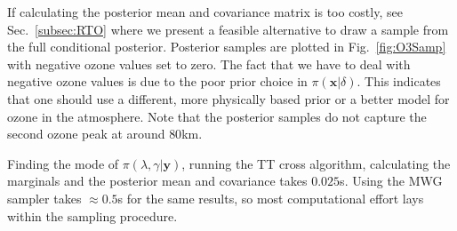 If calculating the posterior mean and covariance matrix is too costly, see Sec.~\ref{subsec:RTO} where we present a feasible alternative to draw a sample from the full conditional posterior.
Posterior samples are plotted in Fig.~\ref{fig:O3Samp} with negative ozone values set to zero.
The fact that we have to deal with negative ozone values is due to the poor prior choice in $\pi(\bm{x}|\delta)$.
This indicates that one should use a different, more physically based prior or a better model for ozone in the atmosphere.
Note that the posterior samples do not capture the second ozone peak at around $80$km.

Finding the mode of $\pi(\lambda,\gamma|\bm{y})$, running the TT cross algorithm, calculating the marginals and the posterior mean and covariance takes $0.025$s.
Using the MWG sampler takes $\approx0.5$s for the same results, so most computational effort lays within the sampling procedure.


\clearpage

%
